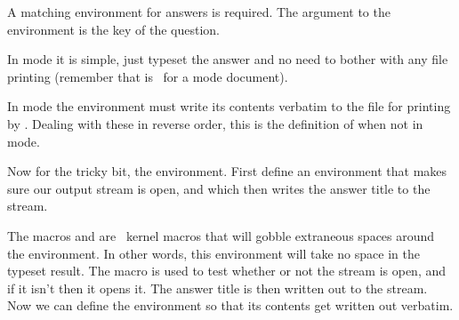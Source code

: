 {{{{    A matching environment for answers is required. 
The argument to the environment is the key of the question.

   In  mode it is simple, just typeset the answer and no need to
bother with any file printing (remember that  is \ptrue\ for a 
 mode document). 
\begin{lcode}
\ifdraftdoc                       %
\newenvironment{answer}[1]%
  {\par\noindent\textbf{Answer \ref{#1}:}}%
  {\par}
\newcommand{\printanswers}{}
\else                             %
\end{lcode}

   In  mode the  environment must write its contents 
verbatim to the  file for printing by \cmd{\printanswers}.
Dealing with these in reverse order, this is the definition of
\cmd{\printanswer} when not in  mode.
\begin{lcode}
\newcommand{\printanswers}{%
  \closeoutputstream{ansout}
  }
\end{lcode}
 
    Now for the tricky bit, the  environment. First define an
environment that makes sure our 
output stream is open, and which then
writes the answer title to the stream.
\begin{lcode}
\newenvironment{@nswer}[1]{\@bsphack
  \IfStreamOpen{ansout}{}{%
    \openoutputfile{\jobname.ans}{ansout}%
  }%
  \addtostream{ansout}{\par\noindent\textbf{Answer \ref{#1}:}}%
  }{\@esphack}
\end{lcode}
The macros \cmd{\@bsphack} and \cmd{\@esphack} are \ltx\ kernel macros
that will gobble extraneous spaces around the 
environment. In other words,
this environment will take no space in the typeset result. The
\cmd{\IfStreamOpen} macro is used to test whether or not the stream is open, 
and if it isn't then it opens it. The answer title is then written
out to the stream. Now we can define the  environment so that
its contents get written out verbatim.
\begin{lcode}
\newenvironment{answer}[1]%
  {\@bsphack\@nswer{#1}\writeverbatim{ansout}}%
  {\par\endwriteverbatim\end@nswer\@esphack}
\fi                               %
\end{lcode}

}}}}
